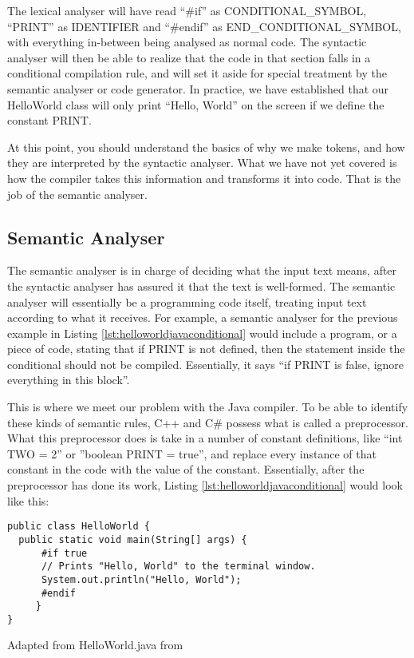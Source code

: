 The lexical analyser will have read ``\#if'' as CONDITIONAL_SYMBOL, ``PRINT'' as IDENTIFIER and ``\#endif'' as END_CONDITIONAL_SYMBOL, with everything in-between being analysed as normal code. The syntactic analyser will then be able to realize that the code in that section falls in a conditional compilation rule, and will set it aside for special treatment by the semantic analyser or code generator. In practice, we have established that our HelloWorld class will only print ``Hello, World'' on the screen if we define the constant PRINT.

At this point, you should understand the basics of why we make tokens, and how they are interpreted by the syntactic analyser. What we have not yet covered is how the compiler takes this information and transforms it into code. That is the job of the semantic analyser.


\subsection{Semantic Analyser}

The semantic analyser is in charge of deciding what the input text means, after the syntactic analyser has assured it that the text is well-formed. The semantic analyser will essentially be a programming code itself, treating input text according to what it receives. For example, a semantic analyser for the previous example in Listing \ref{lst:helloworldjavaconditional} would include a program, or a piece of code, stating that if PRINT is not defined, then the statement inside the conditional should not be compiled. Essentially, it says ``if PRINT is false, ignore everything in this block''.

This is where we meet our problem with the Java compiler. To be able to identify these kinds of semantic rules, C++ and C\# possess what is called a preprocessor. What this preprocessor does is take in a number of constant definitions, like ``int TWO = 2'' or ''boolean PRINT = true'', and replace every instance of that constant in the code with the value of the constant. Essentially, after the preprocessor has done its work, Listing \ref{lst:helloworldjavaconditional} would look like this:

\begin{listing}
\begin{verbatim}
public class HelloWorld {
  public static void main(String[] args) {
      #if true
      // Prints "Hello, World" to the terminal window.
      System.out.println("Hello, World");
      #endif
     }
}
\end{verbatim}
\caption{Adapted from HelloWorld.java from \cite{SEDGEWICK:2011}} \label{lst:helloworldjavaconditional2}
\end{listing}

